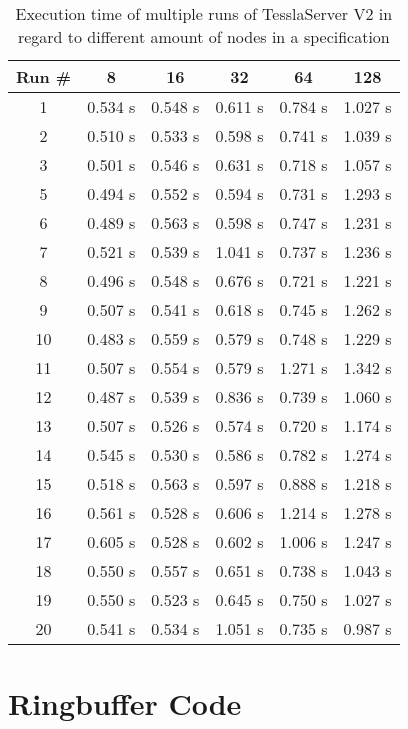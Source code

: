 \begin{table}[!htb]
  \centering
  \caption{Execution time of multiple runs of TesslaServer V2 in regard to different amount of nodes in a specification}
  \label{table:tessla_server_v2_num_nodes}
  \begin{tabular}{clllll}
    Run \# & \multicolumn{1}{c}{8} & \multicolumn{1}{c}{16} & \multicolumn{1}{c}{32} & \multicolumn{1}{c}{64} & \multicolumn{1}{c}{128}\\ \hline
    1 &  0.534 s & 0.548 s & 0.611 s & 0.784 s & 1.027 s \\
    2 &  0.510 s & 0.533 s & 0.598 s & 0.741 s & 1.039 s \\
    3 &  0.501 s & 0.546 s & 0.631 s & 0.718 s & 1.057 s \\
    5 &  0.494 s & 0.552 s & 0.594 s & 0.731 s & 1.293 s \\
    6 &  0.489 s & 0.563 s & 0.598 s & 0.747 s & 1.231 s \\
    7 &  0.521 s & 0.539 s & 1.041 s & 0.737 s & 1.236 s \\
    8 &  0.496 s & 0.548 s & 0.676 s & 0.721 s & 1.221 s \\
    9 &  0.507 s & 0.541 s & 0.618 s & 0.745 s & 1.262 s \\
    10 & 0.483 s & 0.559 s & 0.579 s & 0.748 s & 1.229 s \\
    11 & 0.507 s & 0.554 s & 0.579 s & 1.271 s & 1.342 s \\
    12 & 0.487 s & 0.539 s & 0.836 s & 0.739 s & 1.060 s \\
    13 & 0.507 s & 0.526 s & 0.574 s & 0.720 s & 1.174 s \\
    14 & 0.545 s & 0.530 s & 0.586 s & 0.782 s & 1.274 s \\
    15 & 0.518 s & 0.563 s & 0.597 s & 0.888 s & 1.218 s \\
    16 & 0.561 s & 0.528 s & 0.606 s & 1.214 s & 1.278 s \\
    17 & 0.605 s & 0.528 s & 0.602 s & 1.006 s & 1.247 s \\
    18 & 0.550 s & 0.557 s & 0.651 s & 0.738 s & 1.043 s \\
    19 & 0.550 s & 0.523 s & 0.645 s & 0.750 s & 1.027 s \\
    20 & 0.541 s & 0.534 s & 1.051 s & 0.735 s & 0.987 s
  \end{tabular}
\end{table}

\clearpage

\section{Ringbuffer Code}
\label{sec:appendix:ringbuffer}


